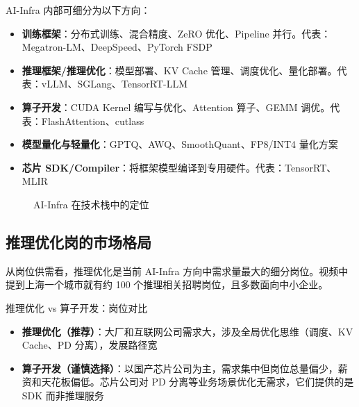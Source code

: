 \documentclass[a4paper]{article}
\begin{document}
AI-Infra 内部可细分为以下方向：

\begin{itemize}
  \item \textbf{训练框架}：分布式训练、混合精度、ZeRO 优化、Pipeline 并行。代表：Megatron-LM、DeepSpeed、PyTorch FSDP
  \item \textbf{推理框架/推理优化}：模型部署、KV Cache 管理、调度优化、量化部署。代表：vLLM、SGLang、TensorRT-LLM
  \item \textbf{算子开发}：CUDA Kernel 编写与优化、Attention 算子、GEMM 调优。代表：FlashAttention、cutlass
  \item \textbf{模型量化与轻量化}：GPTQ、AWQ、SmoothQuant、FP8/INT4 量化方案
  \item \textbf{芯片 SDK/Compiler}：将框架模型编译到专用硬件。代表：TensorRT、MLIR
\end{itemize}

\begin{figure}[H]
\centering
{}
\caption{AI-Infra 在技术栈中的定位}
\end{figure}

\subsection{推理优化岗的市场格局}

从岗位供需看，推理优化是当前 AI-Infra 方向中需求量最大的细分岗位。视频中提到上海一个城市就有约 100 个推理相关招聘岗位，且多数面向中小企业。

\begin{knowledgebox}{推理优化 vs 算子开发：岗位对比}
  \begin{itemize}
    \item \textbf{推理优化（推荐）}：大厂和互联网公司需求大，涉及全局优化思维（调度、KV Cache、PD 分离），发展路径宽
    \item \textbf{算子开发（谨慎选择）}：以国产芯片公司为主，需求集中但岗位总量偏少，薪资和天花板偏低。芯片公司对 PD 分离等业务场景优化无需求，它们提供的是 SDK 而非推理服务
  \end{itemize}
\end{knowledgebox}
\end{document}
